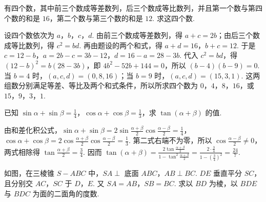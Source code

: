 \documentclass[UTF8,a4paper,oneside,11pt]{ctexbook}
\begin{document}
\begin{problem}
有四个数，其中前三个数成等差数列，后三个数成等比数列，并且第一个数与第四个数的和是 \(16\)，第二个数与第三个数的和是 \(12\). 求这四个数.
\end{problem}

\begin{solution}
设四个数依次为 \(a\)，\(b\)，\(c\)，\(d\). 由前三个数成等差数列，得 \(a+c=2b\)；由后三个数成等比数列，得 \(c^2=bd\). 再由题设的两个和式，得 \(a+d=16\)，\(b+c=12\). 于是 \(c=12-b\)，\(a=2b-c=3b-12\)，\(d=16-a=28-3b\). 代入 \(c^2=bd\)，得 \((12-b)^2=b(28-3b)\)，即 \(4b^2-52b+144=0\)，所以 \((b-4)(b-9)=0\). 当 \(b=4\) 时，\((a,c,d)=(0,8,16)\)；当 \(b=9\) 时，\((a,c,d)=(15,3,1)\). 这两组数分别满足等差、等比及两个和式条件，所以所求四个数为 \(0\)，\(4\)，\(8\)，\(16\)，或 \(15\)，\(9\)，\(3\)，\(1\).
\end{solution}

\begin{problem}
已知 \(\sin \alpha+\sin \beta=\frac{1}{4}\)，\(\cos \alpha+\cos \beta=\frac{1}{3}\)，求 \(\tan(\alpha+\beta)\) 的值.
\end{problem}

\begin{solution}
由和差化积公式，\(\sin\alpha+\sin\beta=2\sin\frac{\alpha+\beta}{2}\cos\frac{\alpha-\beta}{2}=\frac{1}{4}\)，\(\cos\alpha+\cos\beta=2\cos\frac{\alpha+\beta}{2}\cos\frac{\alpha-\beta}{2}=\frac{1}{3}\). 第二式右端不为零，所以 \(\cos\frac{\alpha-\beta}{2}\neq0\)，两式相除得 \(\tan\frac{\alpha+\beta}{2}=\frac{3}{4}\). 因而 \(\tan(\alpha+\beta)=\frac{2\tan\frac{\alpha+\beta}{2}}{1-\tan^2\frac{\alpha+\beta}{2}}=\frac{2\cdot\frac{3}{4}}{1-\left(\frac{3}{4}\right)^2}=\frac{24}{7}\).
\end{solution}

\begin{problem}
如图，在三棱锥 \(S-ABC\) 中，\(SA\perp\) 底面 \(ABC\)，\(AB\perp BC\). \(DE\) 垂直平分 \(SC\)，且分别交 \(AC\)，\(SC\) 于 \(D\)，\(E\). 又 \(SA=AB\)，\(SB=BC\). 求以 \(BD\) 为棱，以 \(BDE\) 与 \(BDC\) 为面的二面角的度数.

\end{problem}
\end{document}
